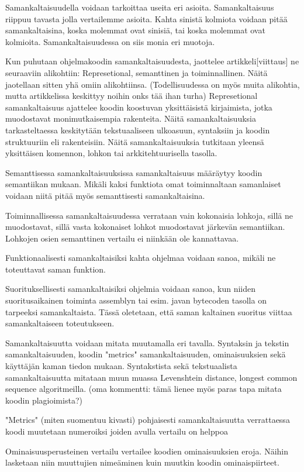 \documentclass[finnish]{tktltiki2}
\theoremstyle{definition}
\theoremstyle{remark}
\begin{document}
Samankaltaisuudella voidaan tarkoittaa useita eri asioita. Samankaltaisuus riippuu tavasta jolla vertailemme asioita. Kahta sinistä kolmiota voidaan pitää samankaltaisina, koska molemmat ovat sinisiä, tai koska molemmat ovat kolmioita. Samankaltaisuudessa on siis monia eri muotoja.

Kun puhutaan ohjelmakoodin samankaltaisuudesta, jaottelee artikkeli[viittaus] ne seuraaviin alikohtiin: Represetional, semanttinen ja toiminnallinen. Näitä jaotellaan sitten yhä omiin alikohtiinsa.
(Todellisuudessa on myös muita alikohtia, mutta artikkelissa keskittyy noihin onks tää ihan turha)
Represetional samankaltaisuus ajattelee koodin koostuvan yksittäisistä kirjaimista, jotka muodostavat monimutkaisempia rakenteita. Näitä samankaltaisuuksia tarkasteltaessa keskitytään tekstuaaliseen ulkoasuun, syntaksiin ja koodin struktuuriin eli rakenteisiin.
Näitä samankaltaisuuksia tutkitaan yleensä yksittäisen komennon, lohkon tai arkkitehtuurisella tasolla.

Semanttisessa samankaltaisuuksissa samankaltaisuus määräytyy koodin semantiikan mukaan. Mikäli kaksi funktiota omat toiminnaltaan samanlaiset voidaan niitä pitää myös semanttisesti samankaltaisina.

Toiminnallisessa samankaltaisuudessa verrataan vain kokonaisia lohkoja, sillä ne muodostavat, sillä vasta kokonaiset lohkot muodostavat järkevän semantiikan. Lohkojen osien semanttinen vertailu ei niinkään ole kannattavaa. 

Funktionaalisesti samankaltaisiksi kahta ohjelmaa voidaan sanoa, mikäli ne toteuttavat saman funktion. 

Suorituksellisesti samankaltaisiksi ohjelmia voidaan sanoa, kun niiden suoritusaikainen toiminta assemblyn tai esim. javan bytecoden tasolla on tarpeeksi samankaltaista. Tässä oletetaan, että saman kaltainen suoritus viittaa samankaltaiseen toteutukseen.


Samankaltaisuutta voidaan mitata muutamalla eri tavalla. Syntaksin ja tekstin samankaltaisuuden, koodin "metrics" samankaltaisuuden, ominaisuuksien  sekä käyttäjän kaman tiedon mukaan.
Syntakstista sekä tekstuaalista samankaltaisuutta mitataan muun muassa Levenshtein distance, longest common sequence algoritmeilla. (oma kommentti: tämä lienee myös paras tapa mitata koodin plagioimista?)

"Metrics" (miten suomentuu kivasti) pohjaisesti samankaltaisuutta verrattaessa koodi muutetaan numeroiksi joiden avulla vertailu on helppoa

Ominaisuusperusteinen vertailu vertailee koodien ominaisuuksien eroja. Näihin lasketaan niin muuttujien nimeäminen kuin muutkin koodin ominaispiirteet.
\end{document}
